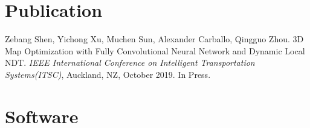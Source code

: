 \documentclass[margin,line,pifont,palatino,courier]{res}
\newenvironment{list2}{
	\begin{list}{$\bullet$}{%
			\setlength{\itemsep}{0in}
			\setlength{\parsep}{0in} \setlength{\parskip}{0in}
			\setlength{\topsep}{0in} \setlength{\partopsep}{0in}
			\setlength{\leftmargin}{0.2in}}}{\end{list}}
\begin{document}
\begin{resume}

		\section{\sc Publication}
			
			\begin{enumerate}[{[1]}]
				\item Zebang Shen, Yichong Xu, Muchen Sun, Alexander Carballo, Qingguo Zhou. 3D Map Optimization with Fully Convolutional Neural Network and Dynamic Local NDT. {\it IEEE International Conference on Intelligent Transportation Systems(ITSC)}, Auckland, NZ, October 2019. In Press.
			\end{enumerate}
		
		\section{\sc Software}
		
		

\end{resume}
\end{document}
